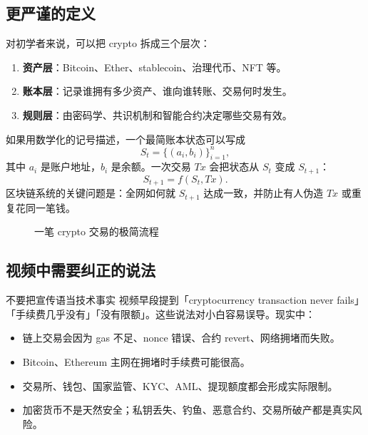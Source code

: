 \documentclass[UTF8,11pt]{ctexart}
\newcommand{\term}[1]{\textbf{\sffamily #1}}
\begin{document}
\subsection{更严谨的定义}

对初学者来说，可以把 crypto 拆成三个层次：

\begin{enumerate}
  \item \term{资产层}：Bitcoin、Ether、stablecoin、治理代币、NFT 等。
  \item \term{账本层}：记录谁拥有多少资产、谁向谁转账、交易何时发生。
  \item \term{规则层}：由密码学、共识机制和智能合约决定哪些交易有效。
\end{enumerate}

如果用数学化的记号描述，一个最简账本状态可以写成
\[
S_t = \{(a_i, b_i)\}_{i=1}^n,
\]
其中 \(a_i\) 是账户地址，\(b_i\) 是余额。一次交易 \(Tx\) 会把状态从 \(S_t\) 变成 \(S_{t+1}\)：
\[
S_{t+1} = f(S_t, Tx).
\]
区块链系统的关键问题是：全网如何就 \(S_{t+1}\) 达成一致，并防止有人伪造 \(Tx\) 或重复花同一笔钱。

\begin{figure}[h]
\centering
{}
\caption{一笔 crypto 交易的极简流程}
\end{figure}

\subsection{视频中需要纠正的说法}

\begin{warnbox}{不要把宣传语当技术事实}
视频早段提到「cryptocurrency transaction never fails」「手续费几乎没有」「没有限额」。这些说法对小白容易误导。现实中：
\begin{itemize}
  \item 链上交易会因为 gas 不足、nonce 错误、合约 revert、网络拥堵而失败。
  \item Bitcoin、Ethereum 主网在拥堵时手续费可能很高。
  \item 交易所、钱包、国家监管、KYC、AML、提现额度都会形成实际限制。
  \item 加密货币不是天然安全；私钥丢失、钓鱼、恶意合约、交易所破产都是真实风险。
\end{itemize}
\end{warnbox}
\end{document}
